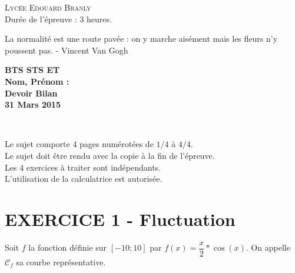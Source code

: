 \documentclass[12pt]{article}
\begin{document}
\setlength{\columnseprule}{0pt}

  \textsc{\LARGE Lycée Edouard Branly}\\[1.0cm] %
  {\huge Durée de l'épreuve : 3 heures.}\\[0.5cm]

\noindent\hrulefill

\begin{center}
  \textsf{La normalité est une route pavée : on y marche aisément mais les fleurs n'y poussent pas. - Vincent Van Gogh}\\
\end{center}

\noindent\hrulefill

\begin{minipage}[t]{\textwidth}
  \raggedright
      {\bfseries BTS STS ET}\\
      {\bfseries Nom, Prénom : }\\[.35ex]
      \vspace*{-1cm}
      \raggedleft
          {\bfseries Devoir Bilan}\\[.35ex]
          {\bfseries 31 Mars 2015}\\[.35ex]
\end{minipage}\\[1em]

\noindent\hrulefill

\noindent\hrulefill

  \begin{minipage}{\textwidth}
    \begin{flushright} 
      Le sujet comporte $4$  pages numérotées de   $1/4$   à  $4/4$.\\
      Le sujet doit être rendu avec la copie à la fin de l’épreuve.\\
      Les 4 exercices à traiter sont indépendants.\\
      L'utilisation de la calculatrice est autorisée.\\
    \end{flushright}
  \end{minipage}


\section*{EXERCICE 1 - Fluctuation}



Soit $f$ la fonction définie sur $[-10 ; 10]$ par $f(x) = \dfrac{x}{2} * \cos(x)$. On appelle $\mathcal{C}_f$ sa courbe représentative.
\end{document}
